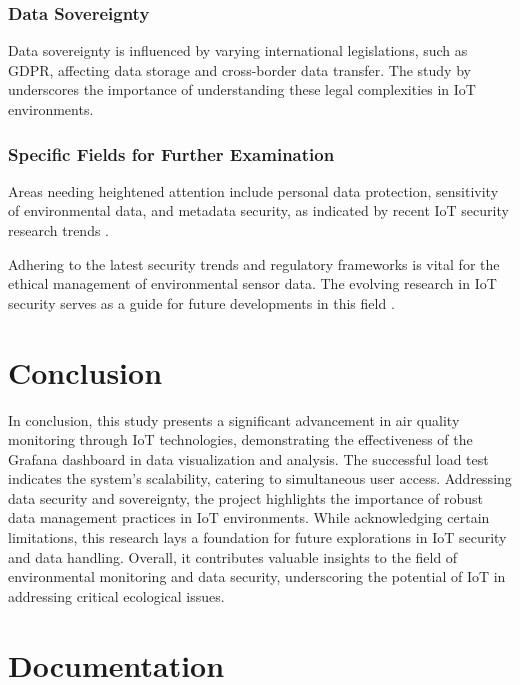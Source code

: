\documentclass[12pt,oneside]{book} %
\begin{document}
\subsection{Data Sovereignty}
Data sovereignty is influenced by varying international legislations, such as
GDPR, affecting data storage and cross-border data transfer. The study by
\citeauthor{CurrentResearchIoTSecurity2020} underscores the importance of
understanding these legal complexities in IoT environments.

\subsection{Specific Fields for Further Examination}
Areas needing heightened attention include personal data protection,
sensitivity of environmental data, and metadata security, as indicated by
recent IoT security research trends \cite{CurrentResearchIoTSecurity2020}.

Adhering to the latest security trends and regulatory frameworks is vital for
the ethical management of environmental sensor data. The evolving research in
IoT security serves as a guide for future developments in this field
\cite{CurrentResearchIoTSecurity2020}.

\newpage
\chapter{Conclusion}

In conclusion, this study presents a significant advancement in air quality
monitoring through IoT technologies, demonstrating the effectiveness of the
Grafana dashboard in data visualization and analysis. The successful load test
indicates the system's scalability, catering to simultaneous user access.
Addressing data security and sovereignty, the project highlights the importance
of robust data management practices in IoT environments. While acknowledging
certain limitations, this research lays a foundation for future explorations in
IoT security and data handling. Overall, it contributes valuable insights to
the field of environmental monitoring and data security, underscoring the
potential of IoT in addressing critical ecological issues.




\appendix
\chapter{Documentation}
\end{document}
